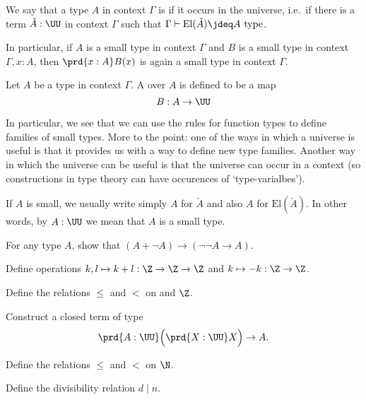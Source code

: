 \begin{defn}
We say that a type $A$ in context $\Gamma$ is  if it occurs in the universe, i.e.~if there is a term $\check{A}:\UU$ in context $\Gamma$ such that $\Gamma\vdash\mathrm{El}(\check{A})\jdeq A~\mathrm{type}$.
\end{defn}

In particular, if $A$ is a small type in context $\Gamma$ and $B$ is a small type in context $\Gamma,x:A$, then $\prd{x:A}B(x)$ is again a small type in context $\Gamma$.

\begin{defn}
Let $A$ be a type in context $\Gamma$. A  over $A$ is defined to be a map
\begin{equation*}
B:A\to\UU
\end{equation*}
\end{defn}

In particular, we see that we can use the rules for function types to define families of small types. More to the point: one of the ways in which a universe is useful is that it provides us with a way to define new type families. Another way in which the universe can be useful is that the universe can occur in a context (so constructions in type theory can have occurences of `type-varialbes').

\begin{rmk}
If $A$ is small, we usually write simply $A$ for $\check{A}$ and also $A$ for $\mathrm{El}(\check{A})$. In other words, by $A:\UU$ we mean that $A$ is a small type. 
\end{rmk}

\begin{exercises}
\item For any type $A$, show that $(A+\neg A)\to(\neg\neg A\to A)$. 
\item \label{ex:int_group_ops}Define operations $k,l\mapsto k+l:\Z\to\Z\to\Z$ and $k\mapsto -k:\Z\to \Z$.
\item \label{ex:int_order}Define the relations $\leq$ and $<$ on and $\Z$.
\item Construct a closed term of type
\begin{equation*}
\prd{A:\UU}\Big(\prd{X:\UU}X\Big)\to A.
\end{equation*}
\item Define the relations $\leq$ and $<$ on $\N$.
\item Define the divisibility relation $d\mid n$. 
\end{exercises}

